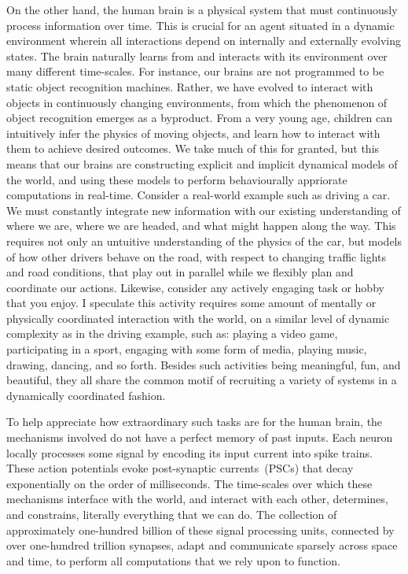 On the other hand, the human brain is a physical system that must continuously process information over time.
This is crucial for an agent situated in a dynamic environment wherein all interactions depend on internally and externally evolving states.
The brain naturally learns from and interacts with its environment over many different time-scales. 
For instance, our brains are not programmed to be static object recognition machines. Rather, we have evolved to interact with objects in continuously changing environments, from which the phenomenon of object recognition emerges as a byproduct.
From a very young age, children can intuitively infer the physics of moving objects, and learn how to interact with them to achieve desired outcomes.
We take much of this for granted, but this means that our brains are constructing explicit and implicit dynamical models of the world, and using these models
to perform behaviourally appriorate computations in real-time.
Consider a real-world example such as driving a car. We must constantly integrate new information with our existing understanding of where we are, where we are headed, and what might happen along the way.
This requires not only an untuitive understanding of the physics of the car, but models of how other drivers behave on the road, with respect to changing traffic lights and road conditions, that play out in parallel while we flexibly plan and coordinate our actions.
Likewise, consider any actively engaging task or hobby that you enjoy.
I speculate this activity requires some amount of mentally or physically coordinated interaction with the world, on a similar level of dynamic complexity as in the driving example, such as: playing a video game, participating in a sport, engaging with some form of media, playing music, drawing, dancing, and so forth.
Besides such activities being meaningful, fun, and beautiful, they all share the common motif of recruiting a variety of systems in a dynamically coordinated fashion.

To help appreciate how extraordinary such tasks are for the human brain, the mechanisms involved do not have a perfect memory of past inputs.
Each neuron locally processes some signal by encoding its input current into spike trains.
These action potentials evoke post-synaptic currents~(PSCs) that decay exponentially on the order of milliseconds.
The time-scales over which these mechanisms interface with the world, and interact with each other, determines, and constrains, literally everything that we can do.
The collection of approximately one-hundred billion of these signal processing units, connected by over one-hundred trillion synapses, adapt and communicate sparsely across space and time, to perform all computations that we rely upon to function.


